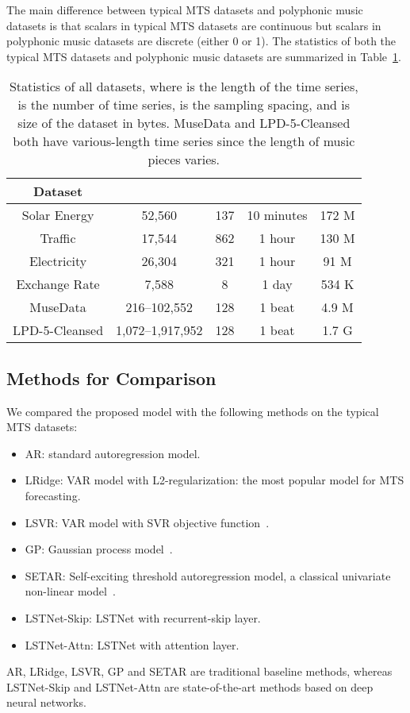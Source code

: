 The main difference between typical MTS datasets and polyphonic music datasets is that scalars in typical MTS datasets are continuous but scalars in polyphonic music datasets are discrete (either 0 or 1).
The statistics of both the typical MTS datasets and polyphonic music datasets are summarized in Table~\ref{tab:data-stats}.

\begin{table}[t]
    \footnotesize
    \centering
    \begin{tabular}{|c||c|c|c|c|}
    \hline
    Dataset       &     &  &        &  \\
    \hline 
    \hline 
    Solar Energy  & 52,560 & 137 & 10 minutes & 172 M\\
    \hline
    Traffic       & 17,544 & 862 & 1 hour     & 130 M \\
    \hline
    Electricity   & 26,304 & 321 & 1 hour     & 91 M \\
    \hline
    Exchange Rate &  7,588 &  8  & 1 day      & 534 K \\
    \hline 
    MuseData       & 216--102,552   & 128 & 1 beat & 4.9 M \\ 
    \hline 
    LPD-5-Cleansed & 1,072--1,917,952 & 128 & 1 beat & 1.7 G \\
    \hline
    \end{tabular}
    \caption{Statistics of all datasets, where  is the length of the time series,  is the number of time series,  is the sampling spacing, and  is size of the dataset in bytes. MuseData and LPD-5-Cleansed both have various-length time series since the length of music pieces varies.}
    \label{tab:data-stats}
\end{table}


\subsection{Methods for Comparison}
We compared the proposed model with the following methods on the typical MTS datasets:
\begin{itemize}
    \item AR: standard autoregression model.
    \item LRidge: VAR model with L2-regularization: the most popular model for MTS forecasting.
    \item LSVR: VAR model with SVR objective function~\cite{SVM}.
    \item GP: Gaussian process model~\cite{Gaussian-Process_1,Gaussian-Process_2}.
    \item SETAR: Self-exciting threshold autoregression model, a classical univariate non-linear model~\cite{SETAR}.
    \item LSTNet-Skip: LSTNet with recurrent-skip layer.
    \item LSTNet-Attn: LSTNet with attention layer.
\end{itemize}
AR, LRidge, LSVR, GP and SETAR are traditional baseline methods, whereas LSTNet-Skip and LSTNet-Attn are state-of-the-art methods based on deep neural networks.


